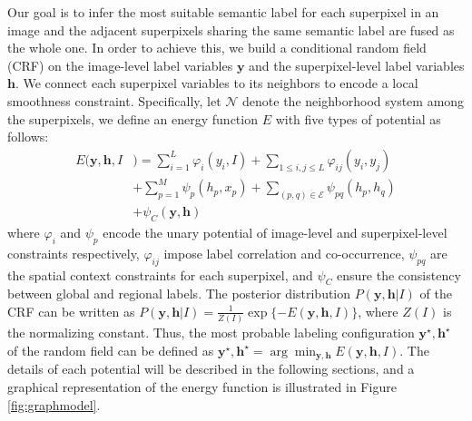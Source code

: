 Our goal is to infer the most suitable semantic label for each superpixel in an image and the adjacent superpixels sharing the same semantic label are fused as the whole one.
In order to achieve this, we build a conditional random field (CRF) on the image-level label variables $\boldsymbol{y}$ and the superpixel-level label variables $\boldsymbol{h}$.
We connect each superpixel variables to its neighbors to encode a local smoothness constraint.
Specifically, let $\mathcal{N}$ denote the neighborhood system among the superpixels, we define an energy function $E$ with five types of potential as follows:
\begin{equation}
    \label{eq:energyfunction}
    \begin{aligned}
        E(\boldsymbol{y},\boldsymbol{h},I&) = \sum_{i=1}^L{\varphi_{i}(y_i,I)}
                            + \sum_{1 \le i,j \le L} {\varphi_{ij}(y_i,y_j)}\\ &+ \sum_{p=1}^M{\psi_{p}(h_p,x_p)}+ \sum_{(p,q) \in \mathcal{E}}{\psi_{pq}(h_p,h_q)}\\ &+ \psi_{C}(\boldsymbol{y},\boldsymbol{h})
    \end{aligned}
\end{equation}
where $\varphi_{i}$ and $\psi_{p}$ encode the unary potential of image-level and superpixel-level constraints respectively, $\varphi_{ij}$ impose label correlation and co-occurrence, $\psi_{pq}$ are the spatial context constraints for each superpixel, and $\psi_C$ ensure the consistency between global and regional labels.
The posterior distribution $P(\boldsymbol{y},\boldsymbol{h}|I)$ of the CRF can be written as $P(\boldsymbol{y},\boldsymbol{h}|I) = \frac{1}{Z(I)}\exp{\{-E(\boldsymbol{y},\boldsymbol{h},I)\}}$, where $Z(I)$ is the normalizing constant.
Thus, the most probable labeling configuration $\boldsymbol{y}^{\star},\boldsymbol{h}^{\star}$ of the random field can be defined as  $\boldsymbol{y}^{\star},\boldsymbol{h}^{\star} = \arg \min_{\boldsymbol{y},\boldsymbol{h}} E(\boldsymbol{y},\boldsymbol{h},I)$.
The details of each potential will be described in the following sections, and a graphical representation of the energy function is illustrated in Figure \ref{fig:graphmodel}.


